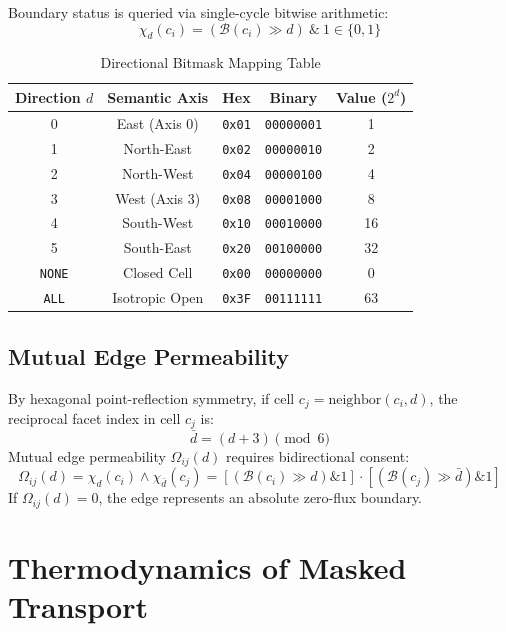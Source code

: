 \documentclass[10pt,twocolumn,letterpaper]{article}
\begin{document}
Boundary status is queried via single-cycle bitwise arithmetic:
\begin{equation}
  \chi_d(c_i) = (\mathcal{B}(c_i) \gg d) \ \& \ 1 \in \{0, 1\}
\end{equation}

\begin{table}[h]
\centering
\small
\caption{Directional Bitmask Mapping Table}
\label{tab:bitmask_mapping}
\begin{tabular}{ccccc}
\toprule
Direction $d$ & Semantic Axis & Hex & Binary & Value ($2^d$) \\
\midrule
0 & East (Axis 0) & \texttt{0x01} & \texttt{00000001} & 1 \\
1 & North-East & \texttt{0x02} & \texttt{00000010} & 2 \\
2 & North-West & \texttt{0x04} & \texttt{00000100} & 4 \\
3 & West (Axis 3) & \texttt{0x08} & \texttt{00001000} & 8 \\
4 & South-West & \texttt{0x10} & \texttt{00010000} & 16 \\
5 & South-East & \texttt{0x20} & \texttt{00100000} & 32 \\
\midrule
\texttt{NONE} & Closed Cell & \texttt{0x00} & \texttt{00000000} & 0 \\
\texttt{ALL} & Isotropic Open & \texttt{0x3F} & \texttt{00111111} & 63 \\
\bottomrule
\end{tabular}
\end{table}

\subsection{Mutual Edge Permeability}
By hexagonal point-reflection symmetry, if cell $c_j = \text{neighbor}(c_i, d)$, the reciprocal facet index in cell $c_j$ is:
\begin{equation}
  \bar{d} = (d + 3) \pmod 6
\end{equation}
Mutual edge permeability $\Omega_{ij}(d)$ requires bidirectional consent:
\begin{equation}
  \Omega_{ij}(d) = \chi_d(c_i) \land \chi_{\bar{d}}(c_j) = \left[(\mathcal{B}(c_i) \gg d) \& 1\right] \cdot \left[(\mathcal{B}(c_j) \gg \bar{d}) \& 1\right]
\end{equation}
If $\Omega_{ij}(d) = 0$, the edge represents an absolute zero-flux boundary.

\section{Thermodynamics of Masked Transport}
\end{document}

